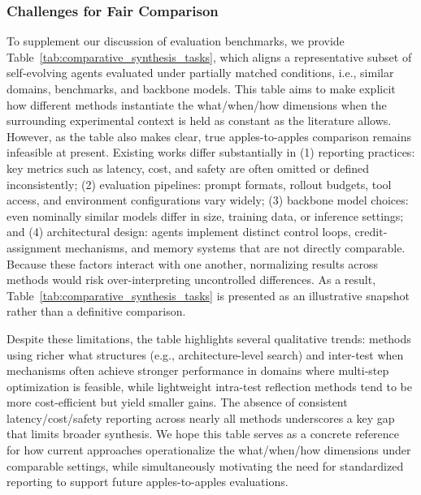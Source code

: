 \subsubsection{Challenges for Fair Comparison}
To supplement our discussion of evaluation benchmarks, we provide Table~\ref{tab:comparative_synthesis_tasks}, which aligns a representative subset of self-evolving agents evaluated under partially matched conditions, i.e., similar domains, benchmarks, and backbone models. This table aims to make explicit how different methods instantiate the what/when/how dimensions when the surrounding experimental context is held as constant as the literature allows. However, as the table also makes clear, true apples-to-apples comparison remains infeasible at present. Existing works differ substantially in (1) reporting practices: key metrics such as latency, cost, and safety are often omitted or defined inconsistently;
(2) evaluation pipelines: prompt formats, rollout budgets, tool access, and environment configurations vary widely;
(3) backbone model choices: even nominally similar models differ in size, training data, or inference settings; and
(4) architectural design: agents implement distinct control loops, credit-assignment mechanisms, and memory systems that are not directly comparable. Because these factors interact with one another, normalizing results across methods would risk over-interpreting uncontrolled differences. As a result, Table~\ref{tab:comparative_synthesis_tasks} is presented as an illustrative snapshot rather than a definitive comparison.

Despite these limitations, the table highlights several qualitative trends: methods using richer what structures (e.g., architecture-level search) and inter-test when mechanisms often achieve stronger performance in domains where multi-step optimization is feasible, while lightweight intra-test reflection methods tend to be more cost-efficient but yield smaller gains. The absence of consistent latency/cost/safety reporting across nearly all methods underscores a key gap that limits broader synthesis. We hope this table serves as a concrete reference for how current approaches operationalize the what/when/how dimensions under comparable settings, while simultaneously motivating the need for standardized reporting to support future apples-to-apples evaluations.

